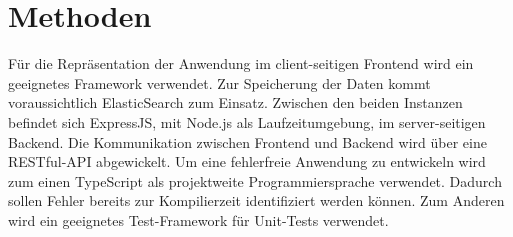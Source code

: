 \documentclass[a4paper, 10pt, conference]{ieeeconf}
\begin{document}
\section{Methoden} \label{s:methoden}
Für die Repräsentation der Anwendung im client-seitigen Frontend wird ein geeignetes Framework verwendet.  Zur Speicherung der Daten kommt voraussichtlich ElasticSearch zum Einsatz. Zwischen den beiden Instanzen befindet sich ExpressJS, mit Node.js als Laufzeitumgebung, im server-seitigen Backend.  Die Kommunikation zwischen Frontend und Backend wird über eine RESTful-API abgewickelt. Um eine fehlerfreie Anwendung zu entwickeln wird zum einen TypeScript als projektweite Programmiersprache verwendet.  Dadurch sollen Fehler bereits zur Kompilierzeit identifiziert werden können.  Zum Anderen wird ein geeignetes Test-Framework für Unit-Tests verwendet. 

\printbibliography
\end{document}
